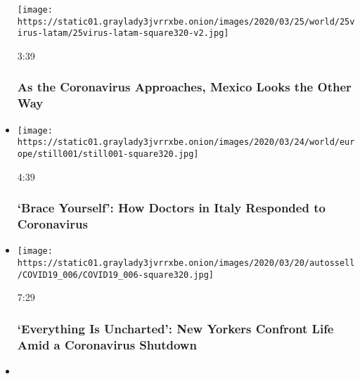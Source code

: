 \begin{itemize}
  \texttt{[image: https://static01.graylady3jvrrxbe.onion/images/2020/03/25/world/25virus-latam/25virus-latam-square320-v2.jpg]}

  3:39

  \hypertarget{as-the-coronavirus-approaches-mexico-looks-the-other-way}{%
  \subsubsection{As the Coronavirus Approaches, Mexico Looks the Other
  Way}\label{as-the-coronavirus-approaches-mexico-looks-the-other-way}}
\item
  \href{https://www.nytimes3xbfgragh.onion/video/world/europe/100000007045579/coronavirus-italy-doctors-lombardy-hospitals-video.html?action=click\&module=video-series-bar\&region=header\&pgtype=Article\&playlistId=video/coronavirus-news-update}{}

  \texttt{[image: https://static01.graylady3jvrrxbe.onion/images/2020/03/24/world/europe/still001/still001-square320.jpg]}

  4:39

  \hypertarget{brace-yourself-how-doctors-in-italy-responded-to-coronavirus}{%
  \subsubsection{`Brace Yourself': How Doctors in Italy Responded to
  Coronavirus}\label{brace-yourself-how-doctors-in-italy-responded-to-coronavirus}}
\item
  \href{https://www.nytimes3xbfgragh.onion/video/nyregion/100000007043833/coronavirus-nyc-shutdown-new-york-city.html?action=click\&module=video-series-bar\&region=header\&pgtype=Article\&playlistId=video/coronavirus-news-update}{}

  \texttt{[image: https://static01.graylady3jvrrxbe.onion/images/2020/03/20/autossell/COVID19\_006/COVID19\_006-square320.jpg]}

  7:29

  \hypertarget{everything-is-uncharted-new-yorkers-confront-life-amid-a-coronavirus-shutdown}{%
  \subsubsection{`Everything Is Uncharted': New Yorkers Confront Life
  Amid a Coronavirus
  Shutdown}\label{everything-is-uncharted-new-yorkers-confront-life-amid-a-coronavirus-shutdown}}
\item
  \href{https://www.nytimes3xbfgragh.onion/video/world/asia/100000007024807/china-coronavirus-propaganda.html?action=click\&module=video-series-bar\&region=header\&pgtype=Article\&playlistId=video/coronavirus-news-update}{}


\end{itemize}
